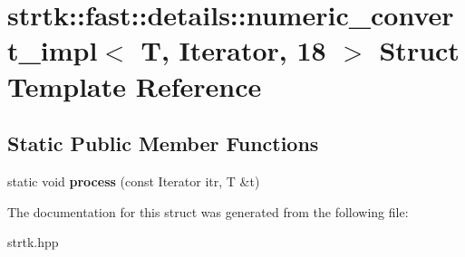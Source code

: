 \hypertarget{structstrtk_1_1fast_1_1details_1_1numeric__convert__impl_3_01T_00_01Iterator_00_0118_01_4}{\section{strtk\-:\-:fast\-:\-:details\-:\-:numeric\-\_\-convert\-\_\-impl$<$ T, Iterator, 18 $>$ Struct Template Reference}
\label{structstrtk_1_1fast_1_1details_1_1numeric__convert__impl_3_01T_00_01Iterator_00_0118_01_4}
}
\subsection*{Static Public Member Functions}
\begin{DoxyCompactItemize}
\item 
\hypertarget{structstrtk_1_1fast_1_1details_1_1numeric__convert__impl_3_01T_00_01Iterator_00_0118_01_4_a5e9a86ad2b0fb283cca8b2ac1e31d2f2}{static void {\bfseries process} (const Iterator itr, T \&t)}\label{structstrtk_1_1fast_1_1details_1_1numeric__convert__impl_3_01T_00_01Iterator_00_0118_01_4_a5e9a86ad2b0fb283cca8b2ac1e31d2f2}

\end{DoxyCompactItemize}


The documentation for this struct was generated from the following file\-:\begin{DoxyCompactItemize}
\item 
strtk.\-hpp\end{DoxyCompactItemize}
